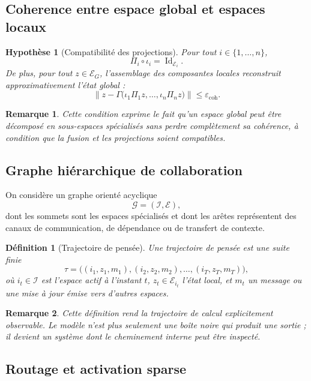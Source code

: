\documentclass[11pt,a4paper]{article}
\newtheorem{definition}{Définition}[section]
\newtheorem{assumption}{Hypothèse}[section]
\newtheorem{remark}{Remarque}[section]
\DeclareMathOperator{\Id}{Id}
\newcommand{\E}{\mathcal E}
\newcommand{\I}{\mathcal I}
\newcommand{\Gcal}{\mathcal G}
\newcommand{\1}{\mathbf 1}
\begin{document}
\subsection{Coherence entre espace global et espaces locaux}

\begin{assumption}[Compatibilité des projections]
Pour tout \(i\in\{1,\dots,n\}\),
\[
\Pi_i\circ \iota_i = \Id_{\E_i}.
\]
De plus, pour tout \(z\in\E_G\), l'assemblage des composantes locales reconstruit approximativement l'état global :
\[
\left\| z - \Gamma\bigl(\iota_1\Pi_1 z,\dots,\iota_n\Pi_n z\bigr)\right\|
\le \varepsilon_{\mathrm{coh}}.
\]
\end{assumption}

\begin{remark}
Cette condition exprime le fait qu'un espace global peut être décomposé en sous-espaces spécialisés sans perdre complètement sa cohérence, à condition que la fusion et les projections soient compatibles.
\end{remark}

\subsection{Graphe hiérarchique de collaboration}

On considère un graphe orienté acyclique
\[
\Gcal=(\I,\mathcal E),
\]
dont les sommets sont les espaces spécialisés et dont les arêtes représentent des canaux de communication, de dépendance ou de transfert de contexte.

\begin{definition}[Trajectoire de pensée]
Une trajectoire de pensée est une suite finie
\[
\tau
=
\bigl((i_1,z_1,m_1),(i_2,z_2,m_2),\dots,(i_T,z_T,m_T)\bigr),
\]
où \(i_t\in\I\) est l'espace actif à l'instant \(t\), \(z_t\in\E_{i_t}\) l'état local, et \(m_t\) un message ou une mise à jour émise vers d'autres espaces.
\end{definition}

\begin{remark}
Cette définition rend la trajectoire de calcul explicitement observable. Le modèle n'est plus seulement une boîte noire qui produit une sortie ; il devient un système dont le cheminement interne peut être inspecté.
\end{remark}

\subsection{Routage et activation sparse}
\end{document}
